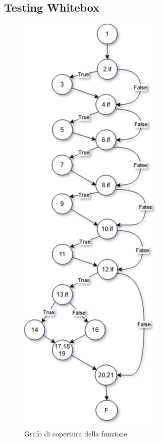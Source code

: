 \pagebreak
\subsection{Testing Whitebox}
\begin{center}
    \begin{figure}[h]
        \centering
        \caption{Grafo di copertura della funzione}
        \includegraphics[scale=0.5]{Figures/Grafo di copertura.png}
    \end{figure}
\end{center}